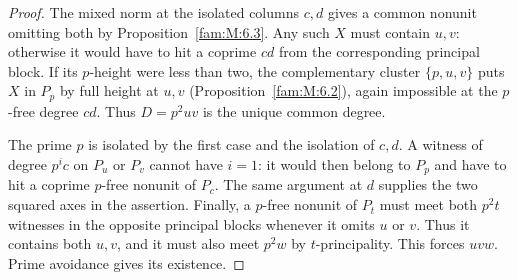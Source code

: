 \documentclass[11pt,a4paper]{article}
\numberwithin{equation}{section}
\theoremstyle{remark}
\begin{document}
\begin{proof}
The mixed norm at the isolated columns $c,d$ gives a common nonunit omitting both by Proposition~\ref{fam:M:6.3}.
Any such $X$ must contain $u,v$: otherwise it would have to
hit a coprime $cd$ from the corresponding principal block.
If its $p$-height were less than two, the complementary cluster
$\{p,u,v\}$ puts $X$ in $P_p$ by full height at $u,v$
(Proposition~\ref{fam:M:6.2}), again impossible at the $p$-free
degree $cd$. Thus $D=p^2uv$ is the unique common degree.

The prime $p$ is isolated by the first case and the isolation of $c,d$.
A witness of degree $p^ic$ on $P_u$ or $P_v$ cannot have $i=1$:
it would then belong to $P_p$ and have to hit a coprime $p$-free
nonunit of $P_c$. The same argument at $d$ supplies the two squared
axes in the assertion. Finally, a $p$-free nonunit of $P_t$ must meet
both $p^2t$ witnesses in the opposite principal blocks whenever it
omits $u$ or $v$. Thus it contains both $u,v$, and it must also
meet $p^2w$ by $t$-principality. This forces $uvw$. Prime avoidance
gives its existence.
\end{proof}
\end{document}
